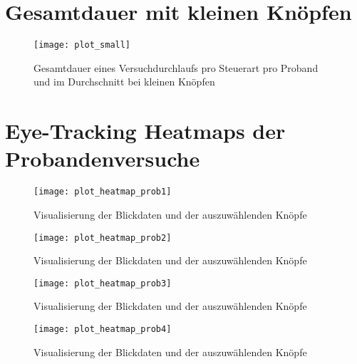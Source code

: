 \section{Gesamtdauer mit kleinen Knöpfen}
\label{appendix:timessmall}
\begin{figure}[!htbp]
	\centering
	\texttt{[image: plot\_small]}
	\caption[Gesamtdauer eines Versuchdurchlaufs pro Steuerart pro Proband und im Durchschnitt bei kleinen Knöpfen] {Gesamtdauer eines Versuchdurchlaufs pro Steuerart pro Proband und im Durchschnitt bei kleinen Knöpfen}
\end{figure}

\section{Eye-Tracking Heatmaps der Probandenversuche}
\label{appendix:heatmaps}
\begin{figure}[!htbp]
	\centering
	\texttt{[image: plot\_heatmap\_prob1]}
	\caption[Visualisierung der Blickdaten und der auszuwählenden Knöpfe] {Visualisierung der Blickdaten und der auszuwählenden Knöpfe}
\end{figure}
\begin{figure}[!htbp]
	\centering
	\texttt{[image: plot\_heatmap\_prob2]}
	\caption[Visualisierung der Blickdaten und der auszuwählenden Knöpfe] {Visualisierung der Blickdaten und der auszuwählenden Knöpfe}
\end{figure}
\begin{figure}[!htbp]
	\centering
	\texttt{[image: plot\_heatmap\_prob3]}
	\caption[Visualisierung der Blickdaten und der auszuwählenden Knöpfe] {Visualisierung der Blickdaten und der auszuwählenden Knöpfe}
\end{figure}
\begin{figure}[!htbp]
	\centering
	\texttt{[image: plot\_heatmap\_prob4]}
	\caption[Visualisierung der Blickdaten und der auszuwählenden Knöpfe] {Visualisierung der Blickdaten und der auszuwählenden Knöpfe}
\end{figure}